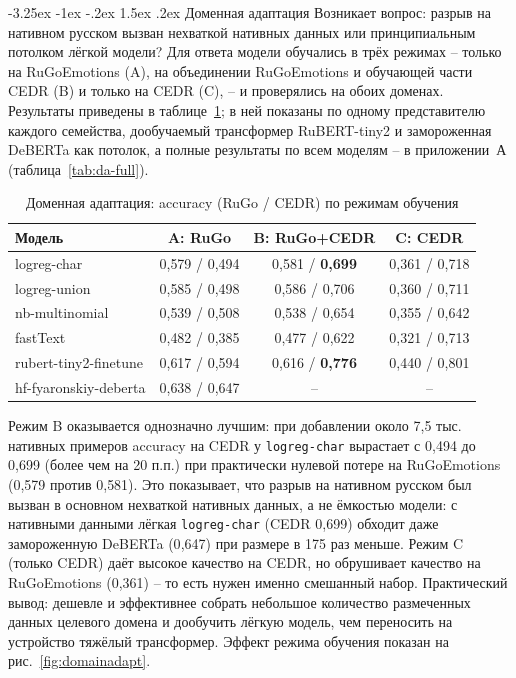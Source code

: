 \documentclass[12pt,a4paper]{report}
\makeatletter
\renewcommand{\subsection}{\@startsection{subsection}{2}{\z@}%
  {-3.25ex \@plus -1ex \@minus -.2ex}%
  {1.5ex \@plus .2ex}%
  {\normalfont\large\bfseries\centering}}
\makeatother
\begin{document}
\subsection{Доменная адаптация}
Возникает вопрос: разрыв на нативном русском вызван нехваткой нативных данных или принципиальным потолком лёгкой модели? Для ответа модели обучались в трёх режимах -- только на RuGoEmotions (A), на объединении RuGoEmotions и обучающей части CEDR (B) и только на CEDR (C), -- и проверялись на обоих доменах. Результаты приведены в таблице~\ref{tab:domainadapt}; в ней показаны по одному представителю каждого семейства, дообучаемый трансформер RuBERT-tiny2 и замороженная DeBERTa как потолок, а полные результаты по всем моделям -- в приложении~А (таблица~\ref{tab:da-full}).

\begin{table}[H]
  \caption{Доменная адаптация: accuracy (RuGo / CEDR) по режимам обучения}
  \label{tab:domainadapt}
  \centering
  {\small
  \setlength{\tabcolsep}{4pt}
  \renewcommand{\arraystretch}{0.92}
  \begin{tabular}{|p{4.0cm}|c|c|c|}
    \hline
    Модель & A: RuGo & B: RuGo+CEDR & C: CEDR \\
    \hline
    logreg-char & 0{,}579 / 0{,}494 & 0{,}581 / \textbf{0{,}699} & 0{,}361 / 0{,}718 \\
    \hline
    logreg-union & 0{,}585 / 0{,}498 & 0{,}586 / 0{,}706 & 0{,}360 / 0{,}711 \\
    \hline
    nb-multinomial & 0{,}539 / 0{,}508 & 0{,}538 / 0{,}654 & 0{,}355 / 0{,}642 \\
    \hline
    fastText & 0{,}482 / 0{,}385 & 0{,}477 / 0{,}622 & 0{,}321 / 0{,}713 \\
    \hline
    rubert-tiny2-finetune & 0{,}617 / 0{,}594 & 0{,}616 / \textbf{0{,}776} & 0{,}440 / 0{,}801 \\
    \hline
    hf-fyaronskiy-deberta & 0{,}638 / 0{,}647 & -- & -- \\
    \hline
  \end{tabular}
  }
\end{table}

Режим B оказывается однозначно лучшим: при добавлении около 7{,}5 тыс. нативных примеров accuracy на CEDR у \texttt{logreg-char} вырастает с 0{,}494 до 0{,}699 (более чем на 20 п.п.) при практически нулевой потере на RuGoEmotions (0{,}579 против 0{,}581). Это показывает, что разрыв на нативном русском был вызван в основном нехваткой нативных данных, а не ёмкостью модели: с нативными данными лёгкая \texttt{logreg-char} (CEDR 0{,}699) обходит даже замороженную DeBERTa (0{,}647) при размере в 175 раз меньше. Режим C (только CEDR) даёт высокое качество на CEDR, но обрушивает качество на RuGoEmotions (0{,}361) -- то есть нужен именно смешанный набор. Практический вывод: дешевле и эффективнее собрать небольшое количество размеченных данных целевого домена и дообучить лёгкую модель, чем переносить на устройство тяжёлый трансформер. Эффект режима обучения показан на рис.~\ref{fig:domainadapt}.
\end{document}

